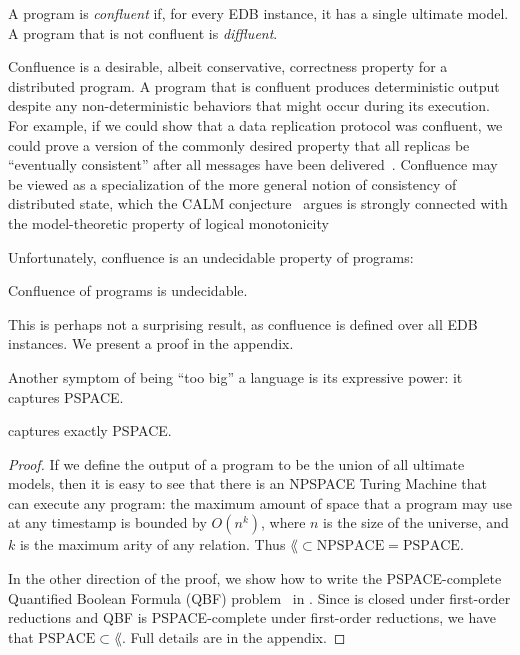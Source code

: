\begin{definition}
  A \lang program is {\em confluent} if, for every EDB instance, it has a single ultimate model.  A program that is not confluent is {\em diffluent}.
\end{definition}


Confluence is a desirable, albeit conservative, correctness property for a
distributed program.  A program that is confluent produces deterministic output
despite any non-deterministic behaviors that might occur during its
execution. For example, if we could show that a data replication protocol was
confluent, we could prove a version of the commonly desired property that all
replicas be ``eventually consistent'' after all messages have been
delivered~\cite{bayou,vogels-ec}.  Confluence may be viewed as a specialization of the
more general notion of consistency of distributed state, which the CALM
conjecture~\cite{declarative-imperative} argues is strongly connected with the
model-theoretic property of logical monotonicity

Unfortunately, confluence is an undecidable property of \lang programs:

\begin{lemma}
\label{lem:confluence-undecidable}
Confluence of \lang programs is undecidable.
\end{lemma}
This is perhaps not a surprising result, as confluence is defined over all EDB instances.  We present a proof in the appendix.


Another symptom of \lang being ``too big'' a language is its expressive power: it captures PSPACE.  

\begin{lemma}
\label{lem:lang-pspace}
\lang captures exactly PSPACE.
\end{lemma}

\begin{proof}
If we define the output of a \lang program to be the union of all ultimate models, then it is easy to see that there is an NPSPACE Turing Machine that can execute any \lang program: the maximum amount of space that a \lang program may use at any timestamp is bounded by $O(n^k)$, where $n$ is the size of the universe, and $k$ is the maximum arity of any relation.  Thus $\lang \subset \text{NPSPACE} = \text{PSPACE}$.

In the other direction of the proof, we show how to write the PSPACE-complete Quantified Boolean Formula (QBF) problem~\cite{garey-johnson} in \lang. Since \lang is closed under first-order reductions and QBF is PSPACE-complete under first-order reductions, we have that $\text{PSPACE} \subset \lang$.  Full details are in the appendix.
\end{proof}

